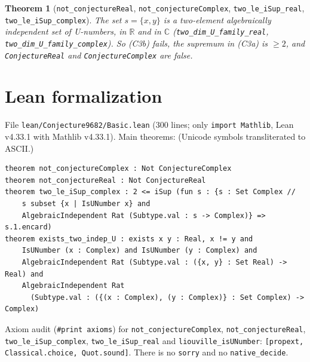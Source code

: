 \documentclass[11pt]{article}
\newtheorem{theorem}{Theorem}
\theoremstyle{definition}
\begin{document}
\begin{theorem}[\texttt{not\_conjectureReal}, \texttt{not\_conjectureComplex},
\texttt{two\_le\_iSup\_real}, \texttt{two\_le\_iSup\_complex}]
The set $s=\{x,y\}$ is a two-element algebraically independent set of U-numbers, in $\mathbb R$
and in $\mathbb C$ (\texttt{two\_dim\_U\_family\_real}, \texttt{two\_dim\_U\_family\_complex}).
So (C3b) fails, the supremum in (C3a) is $\ge2$, and \texttt{ConjectureReal} and
\texttt{ConjectureComplex} are false.
\end{theorem}

\section{Lean formalization}

File \texttt{lean/Conjecture9682/Basic.lean} (300 lines; only \texttt{import Mathlib}, Lean
v4.33.1 with Mathlib v4.33.1). Main theorems:
(Unicode symbols transliterated to ASCII.)
\begin{verbatim}
theorem not_conjectureComplex : Not ConjectureComplex
theorem not_conjectureReal : Not ConjectureReal
theorem two_le_iSup_complex : 2 <= iSup (fun s : {s : Set Complex //
    s subset {x | IsUNumber x} and
    AlgebraicIndependent Rat (Subtype.val : s -> Complex)} => s.1.encard)
theorem exists_two_indep_U : exists x y : Real, x != y and
    IsUNumber (x : Complex) and IsUNumber (y : Complex) and
    AlgebraicIndependent Rat (Subtype.val : ({x, y} : Set Real) -> Real) and
    AlgebraicIndependent Rat
      (Subtype.val : ({(x : Complex), (y : Complex)} : Set Complex) -> Complex)
\end{verbatim}
Axiom audit (\texttt{\#print axioms}) for \texttt{not\_conjectureComplex},
\texttt{not\_conjectureReal}, \texttt{two\_le\_iSup\_complex}, \texttt{two\_le\_iSup\_real} and
\texttt{liouville\_isUNumber}: \texttt{[propext, Classical.choice, Quot.sound]}. There is no
\texttt{sorry} and no \texttt{native\_decide}.
\end{document}

